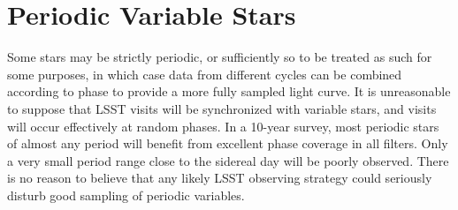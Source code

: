 
%
%
%
%
%
%

\section{Periodic Variable Stars}
\def\secname{periodicvariables}\label{sec:\secname}



Some stars may be strictly periodic, or sufficiently so to be treated as such for some purposes, in which case data from different cycles can be combined according to phase to provide a more fully sampled light curve.  It is unreasonable to suppose that LSST visits will be synchronized with variable stars, and visits will occur effectively at random phases. In a 10-year survey, most periodic stars of almost any period will benefit from  excellent phase coverage in all filters. Only a very small period range close to the sidereal day will be poorly observed.  There is no reason to believe that any likely LSST observing strategy could seriously disturb good sampling of periodic variables.


